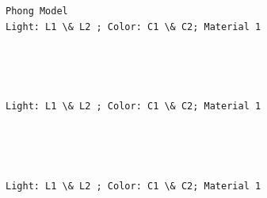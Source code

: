 \documentclass[11pt]{article}
\begin{document}
    \begin{Verbatim}[commandchars=\\\{\}]
Phong Model
Light: L1 \& L2 ; Color: C1 \& C2; Material 1

    \end{Verbatim}

    \begin{center}
    \end{center}
    { \hspace*{\fill} \\}
    
    \begin{center}
    \end{center}
    { \hspace*{\fill} \\}
    
    \begin{Verbatim}[commandchars=\\\{\}]
Light: L1 \& L2 ; Color: C1 \& C2; Material 1

    \end{Verbatim}

    \begin{center}
    \end{center}
    { \hspace*{\fill} \\}
    
    \begin{center}
    \end{center}
    { \hspace*{\fill} \\}
    
    \begin{Verbatim}[commandchars=\\\{\}]
Light: L1 \& L2 ; Color: C1 \& C2; Material 1

    \end{Verbatim}

    \begin{center}
    \end{center}
    { \hspace*{\fill} \\}
    
    \begin{center}
    \end{center}
    { \hspace*{\fill} \\}
    

    
    
    
    
\end{document}
